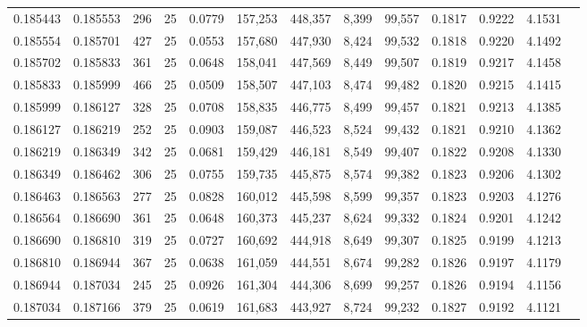 \begin{tabular}{rrrrrrrrrrrrr}
0.185443 & 0.185553 &   296 &  25 &                                     0.0779 & 157,253 & 448,357 &   8,399 &  99,557 & 0.1817 & 0.9222 & 4.1531 \\
0.185554 & 0.185701 &   427 &  25 &                                     0.0553 & 157,680 & 447,930 &   8,424 &  99,532 & 0.1818 & 0.9220 & 4.1492 \\
0.185702 & 0.185833 &   361 &  25 &                                     0.0648 & 158,041 & 447,569 &   8,449 &  99,507 & 0.1819 & 0.9217 & 4.1458 \\
0.185833 & 0.185999 &   466 &  25 &                                     0.0509 & 158,507 & 447,103 &   8,474 &  99,482 & 0.1820 & 0.9215 & 4.1415 \\
0.185999 & 0.186127 &   328 &  25 &                                     0.0708 & 158,835 & 446,775 &   8,499 &  99,457 & 0.1821 & 0.9213 & 4.1385 \\
0.186127 & 0.186219 &   252 &  25 &                                     0.0903 & 159,087 & 446,523 &   8,524 &  99,432 & 0.1821 & 0.9210 & 4.1362 \\
0.186219 & 0.186349 &   342 &  25 &                                     0.0681 & 159,429 & 446,181 &   8,549 &  99,407 & 0.1822 & 0.9208 & 4.1330 \\
0.186349 & 0.186462 &   306 &  25 &                                     0.0755 & 159,735 & 445,875 &   8,574 &  99,382 & 0.1823 & 0.9206 & 4.1302 \\
0.186463 & 0.186563 &   277 &  25 &                                     0.0828 & 160,012 & 445,598 &   8,599 &  99,357 & 0.1823 & 0.9203 & 4.1276 \\
0.186564 & 0.186690 &   361 &  25 &                                     0.0648 & 160,373 & 445,237 &   8,624 &  99,332 & 0.1824 & 0.9201 & 4.1242 \\
0.186690 & 0.186810 &   319 &  25 &                                     0.0727 & 160,692 & 444,918 &   8,649 &  99,307 & 0.1825 & 0.9199 & 4.1213 \\
0.186810 & 0.186944 &   367 &  25 &                                     0.0638 & 161,059 & 444,551 &   8,674 &  99,282 & 0.1826 & 0.9197 & 4.1179 \\
0.186944 & 0.187034 &   245 &  25 &                                     0.0926 & 161,304 & 444,306 &   8,699 &  99,257 & 0.1826 & 0.9194 & 4.1156 \\
0.187034 & 0.187166 &   379 &  25 &                                     0.0619 & 161,683 & 443,927 &   8,724 &  99,232 & 0.1827 & 0.9192 & 4.1121 \\

\end{tabular}
